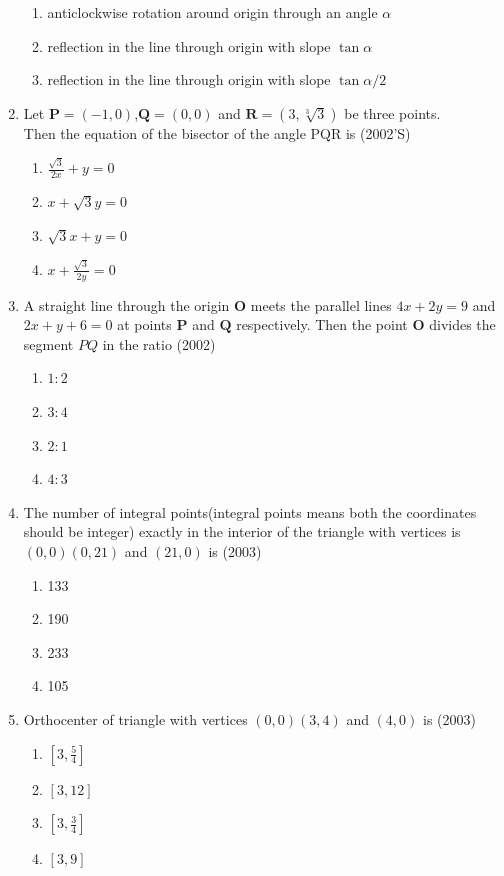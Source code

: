 \documentclass[12pt]{article}
\providecommand{\sbrak}[1]{\ensuremath{{}\left[#1\right]}}
\let\vec\mathbf
\begin{document}
\begin{enumerate}
\begin{enumerate}
\item anticlockwise rotation around origin through an angle $\alpha$
\item reflection in the line through origin with slope $\tan\alpha$
\item reflection in the line through origin with slope $\tan\alpha/2$
\end{enumerate}
\item Let $\vec{P}=(-1,0)$,$\vec{Q}=(0,0)$ and $\vec{R}=(3,\sqrt[3]{3})$ be three points.\\
Then the equation of the bisector of the angle PQR is (2002'S)
\begin{enumerate}
\item $\frac{\sqrt{3}}{2x}+y=0$ 
\item $x+\sqrt{3}y=0$
\item $\sqrt{3}x+y=0$ 
\item $x+\frac{\sqrt{3}}{2y}=0$
\end{enumerate}
\item A straight line through the origin $\vec{O}$ meets the parallel lines $4x+2y=9$ and $2x+y+6=0$ at points $\vec{P}$ and $\vec{Q}$ respectively. Then the point $\vec{O}$ divides the segment $PQ$ in the ratio (2002)
\begin{enumerate}
\item $1:2$   
\item $3:4$
\item $2:1$ 
\item $4:3$ 
\end{enumerate}
\item The number of integral points(integral points means both the coordinates should be integer) exactly in the interior of the triangle with vertices is $(0,0)(0,21)$ and $(21,0)$ is (2003)
\begin{enumerate}
\item 133  
\item 190  
\item 233 
\item 105
\end{enumerate}
\item Orthocenter of triangle with vertices $(0,0)(3,4)$ and $(4,0)$ is  (2003)
\begin{enumerate}
\item $\sbrak{3,\frac{5}{4}}$ 
\item $\sbrak{3,12}$   
\item $\sbrak{3,\frac{3}{4}}$ 
\item $\sbrak{3,9}$
\end{enumerate}

\end{enumerate}
\end{document}
